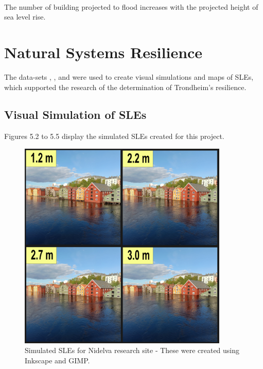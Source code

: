 \paragraph{}
The number of building projected to flood increases with the projected height of sea level rise. 


\section{Natural Systems Resilience}
The data-sets  \cite{geonorge_stormflo_nodate} , \cite{kartverket_se_2021}, \cite{stormflo_database_stormflo_2021} and \cite{ipcc_sea_2021} were used to create visual simulations and maps of SLEs, which supported the research of the determination of Trondheim's resilience. 

\subsection{Visual Simulation of SLEs}
 Figures 5.2 to 5.5 display the simulated SLEs created for this project. 

\begin{figure}[H]
    \centering
    \includegraphics[width=10cm]{fig_sle/nidelva 2090 q.png}
    \caption{Simulated SLEs for Nidelva research site - These were created using Inkscape and GIMP. }
    \label{fig:SLE-nidelva}
\end{figure}

